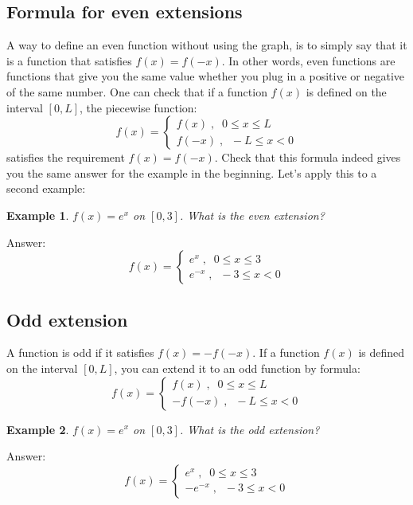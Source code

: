 \documentclass[12pt]{report}
\newtheorem{ex}{Example}[section]
\begin{document}
\subsection*{Formula for even extensions}

A way to define an even function without using the graph, is to simply say that it is a function that satisfies $f(x)=f(-x)$. In other words, even functions are functions that give you the same value whether you plug in a positive or negative of the same number. One can check that if a function $f(x)$ is defined on the interval $[0,L]$, the piecewise function:
$$f(x) = \begin{cases} f(x)  \; , \; \;  0\leq x\leq L \\ f(-x)  \; , \; \; -L \leq x < 0 \end{cases} $$
satisfies the requirement $f(x)=f(-x)$. Check that this formula indeed gives you the same answer for the example in the beginning. Let's apply this to a second example:

\begin{ex} $f(x) = e^x$ on $[0,3]$. What is the even extension?
	\end{ex}
Answer:
$$f(x) = \begin{cases} e^x  \; , \; \;  0\leq x\leq 3 \\ e^{-x}  \; , \; \; -3 \leq x < 0 \end{cases} $$

\subsection*{Odd extension}
A function is odd if it satisfies $f(x)=-f(-x)$. If a function $f(x)$ is defined on the interval $[0,L]$, you can extend it to an odd function by formula:
$$f(x) = \begin{cases} f(x)  \; , \; \;  0\leq x\leq L \\ -f(-x)  \; , \; \; -L \leq x < 0 \end{cases} $$

\begin{ex} $f(x) = e^x$ on $[0,3]$. What is the odd extension?
	\end{ex}
Answer:
$$f(x) = \begin{cases} e^x  \; , \; \;  0\leq x\leq 3 \\ -e^{-x}  \; , \; \; -3 \leq x < 0 \end{cases} $$
\end{document}
